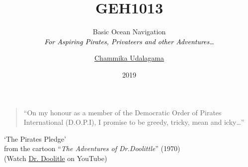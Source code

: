 

\renewcommand\howTitle[3]{
	\title[GEH1013]{\large \bfseries \color{black}GEH1013\\\medskip}
	\subtitle{{{\fontsize{30}{150}\selectfont #1}}\\\smallskip \textcolor{black}{\itshape \small #2}}
	\author[Chammika Udalagama]{\scriptsize \href{mailto:chammika@nus.edu.sg}{\textcolor{green!50!black}{Chammika Udalagama}} 
	}
	\date{2019}
	
	\addtocounter{framenumber}{-3}
}

\howTitle{Basic Ocean Navigation}{For Aspiring Pirates, Privateers and other Adventures\ldots}{Guest Lecture}


%
	
{
	\begin{frame}
\end{frame}
}

{
\begin{frame}
\medskip
\begin{quotation}
	``On my honour as a member of the Democratic Order of Pirates International (D.O.P.I), I promise to be greedy, tricky, mean and icky\ldots''
\end{quotation}
\begin{flushright}
	`The Pirates Pledge'\\\small from the cartoon ``\textit{The Adventures of Dr.Doolittle}'' (1970) \\[5pt]
	\tiny (Watch \href{https://youtu.be/SQtMMYGTNz8}{Dr. Doolitle} on YouTube)
\end{flushright}



\end{frame}	
}

